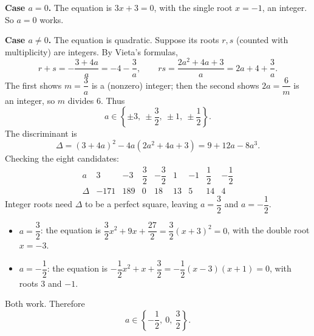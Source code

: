 \textbf{Case $a=0$.} The equation is $3x+3=0$, with the single root $x=-1$, an integer. So $a=0$ works.

\textbf{Case $a\ne0$.} The equation is quadratic. Suppose its roots $r,s$ (counted with multiplicity) are integers. By Vieta's formulas,
\[
r+s=-\dfrac{3+4a}{a}=-4-\dfrac{3}{a},\qquad rs=\dfrac{2a^2+4a+3}{a}=2a+4+\dfrac{3}{a}.
\]
The first shows $m=\dfrac{3}{a}$ is a (nonzero) integer; then the second shows $2a=\dfrac{6}{m}$ is an integer, so $m$ divides $6$. Thus
\[a\in\left\{\pm3,\ \pm\dfrac{3}{2},\ \pm1,\ \pm\dfrac{1}{2}\right\}.\]
The discriminant is
\[
\Delta=(3+4a)^2-4a(2a^2+4a+3)=9+12a-8a^3.
\]
Checking the eight candidates:
\[
\begin{array}{c|cccccccc}
a & 3 & -3 & \dfrac{3}{2} & -\dfrac{3}{2} & 1 & -1 & \dfrac{1}{2} & -\dfrac{1}{2}\\[4pt]\hline
\Delta & -171 & 189 & 0 & 18 & 13 & 5 & 14 & 4
\end{array}
\]
Integer roots need $\Delta$ to be a perfect square, leaving $a=\dfrac{3}{2}$ and $a=-\dfrac{1}{2}$.
\begin{itemize}
\item $a=\dfrac{3}{2}$: the equation is $\dfrac{3}{2}x^2+9x+\dfrac{27}{2}=\dfrac{3}{2}(x+3)^2=0$, with the double root $x=-3$.
\item $a=-\dfrac{1}{2}$: the equation is $-\dfrac{1}{2}x^2+x+\dfrac{3}{2}=-\dfrac{1}{2}(x-3)(x+1)=0$, with roots $3$ and $-1$.
\end{itemize}
Both work. Therefore
\[\boxed{a\in\left\{-\dfrac{1}{2},\ 0,\ \dfrac{3}{2}\right\}}.\]
